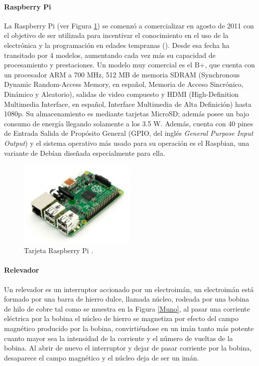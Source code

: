 \paragraph{Raspberry Pi}

La Raspberry Pi (ver Figura \ref{Mcuatro}) se comenzó a comercializar en agosto de 2011 con el objetivo de ser utilizada para incentivar el conocimiento en el uso de la electrónica y la programación en edades tempranas (\cite{MT-04}). Desde esa fecha ha transitado por 4 modelos, aumentando cada vez más su capacidad de procesamiento y prestaciones. Un modelo muy comercial es el B+, que cuenta con un procesador ARM a 700 MHz, 512 MB de memoria SDRAM (Synchronous Dynamic Random-Access Memory, en español, Memoria de Acceso Sincrónico, Dinámico y Aleatorio), salidas de video compuesto y HDMI (High-Definition Multimedia Interface, en español, Interface Multimedia de Alta Definición) hasta 1080p. Su almacenamiento es mediante tarjetas MicroSD; además posee un bajo consumo de energía llegando solamente a los 3.5 W. Además, cuenta con 40 pines de Entrada Salida de Propósito General (GPIO, del inglés \textit{General Purpose Input Output}) y el sistema operativo más usado para su operación es el Raspbian, una variante de Debían diseñada especialmente para ella.

%
\begin{figure}[H]
\centering
\includegraphics[width=0.5\textwidth]{marco/fig4.jpg}
\caption{Tarjeta Raspberry Pi \cite{UPS-08}. }
\label{Mcuatro}
\end{figure}
%

\paragraph{Relevador}
Un relevador es un interruptor accionado por un electroimán, un electroimán está formado por una barra de hierro dulce, llamada núcleo, rodeada por una bobina de hilo de cobre tal como se muestra en la Figura \ref{Muno}, al pasar una corriente eléctrica por la bobina el núcleo de hierro se magnetiza por efecto del campo magnético producido por la bobina, convirtiéndose en un imán tanto más potente cuanto mayor sea la intensidad de la corriente y el número de vueltas de la bobina. Al abrir de nuevo el interruptor y dejar de pasar corriente por la bobina, desaparece el campo magnético y el núcleo deja de ser un imán.

